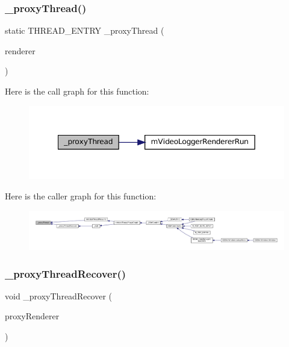 \subsubsection{\texorpdfstring{\+\_\+proxy\+Thread()}{\_proxyThread()}}
{\footnotesize\ttfamily static T\+H\+R\+E\+A\+D\+\_\+\+E\+N\+T\+RY \+\_\+proxy\+Thread (\begin{DoxyParamCaption}\item[{void $\ast$}]{renderer }\end{DoxyParamCaption})\hspace{0.3cm}{\ttfamily [static]}}

Here is the call graph for this function\+:
\nopagebreak
\begin{figure}[H]
\begin{center}
\leavevmode
\includegraphics[width=349pt]{thread-proxy_8c_a7b9189ee6a6460af05b9f19e95015c98_cgraph}
\end{center}
\end{figure}
Here is the caller graph for this function\+:
\nopagebreak
\begin{figure}[H]
\begin{center}
\leavevmode
\includegraphics[width=350pt]{thread-proxy_8c_a7b9189ee6a6460af05b9f19e95015c98_icgraph}
\end{center}
\end{figure}
\mbox{\label{thread-proxy_8c_a9f7602077816bb1ca3bf15db67d76f17}} 
\subsubsection{\texorpdfstring{\+\_\+proxy\+Thread\+Recover()}{\_proxyThreadRecover()}}
{\footnotesize\ttfamily void \+\_\+proxy\+Thread\+Recover (\begin{DoxyParamCaption}\item[{struct m\+Video\+Thread\+Proxy $\ast$}]{proxy\+Renderer }\end{DoxyParamCaption})}

